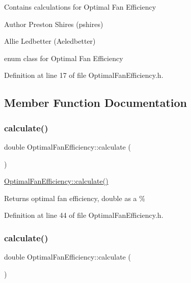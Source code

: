 Contains calculations for Optimal Fan Efficiency \begin{DoxyAuthor}{Author}
Preston Shires (pshires) 

Allie Ledbetter (Aeledbetter) 
\end{DoxyAuthor}
enum class for Optimal Fan Efficiency 

Definition at line 17 of file Optimal\+Fan\+Efficiency.\+h.



\subsection{Member Function Documentation}
\mbox{\label{class_optimal_fan_efficiency_ac35291d1095c74373393ac510e45ae02}} 
\subsubsection{\texorpdfstring{calculate()}{calculate()}\hspace{0.1cm}{\footnotesize\ttfamily [1/3]}}
{\footnotesize\ttfamily double Optimal\+Fan\+Efficiency\+::calculate (\begin{DoxyParamCaption}{ }\end{DoxyParamCaption})\hspace{0.3cm}{\ttfamily [inline]}}

\hyperlink{class_optimal_fan_efficiency_ac35291d1095c74373393ac510e45ae02}{Optimal\+Fan\+Efficiency\+::calculate()} \begin{DoxyReturn}{Returns}
optimal fan efficiency, double as a \% 
\end{DoxyReturn}


Definition at line 44 of file Optimal\+Fan\+Efficiency.\+h.

\mbox{\label{class_optimal_fan_efficiency_ac35291d1095c74373393ac510e45ae02}} 
\subsubsection{\texorpdfstring{calculate()}{calculate()}\hspace{0.1cm}{\footnotesize\ttfamily [2/3]}}
{\footnotesize\ttfamily double Optimal\+Fan\+Efficiency\+::calculate (\begin{DoxyParamCaption}{ }\end{DoxyParamCaption})\hspace{0.3cm}{\ttfamily [inline]}}

